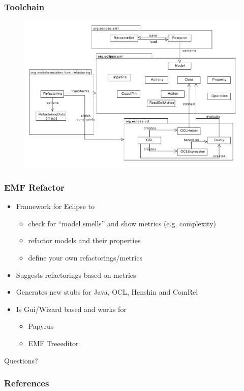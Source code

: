 \documentclass{beamer}
\begin{document}
\begin{frame}
\frametitle{Toolchain}
 \begin{figure}[h!t]
 \centering
 \includegraphics[scale=0.35]{figures/Toolchain2}
\end{figure}
\end{frame}

        
\begin{frame}
\frametitle{EMF Refactor}
\begin{itemize}
 \item Framework for Eclipse to
 \begin{itemize}
  \item check for ``model smells'' and show metrics (e.g. complexity)
  \item refactor models and their properties
  \item define your own refactorings/metrics
 \end{itemize}
 \item Suggests refactorings based on metrics
 \item Generates new stubs for Java, OCL, Henshin and ComRel
 \item Is Gui/Wizard based and works for
 \begin{itemize}
  \item Papyrus
  \item EMF Treeeditor
 \end{itemize}

\end{itemize}

\end{frame}
        

\begin{frame}
 \begin{center}
\Huge Questions?
\end{center}
\end{frame}

\begin{frame}
 \frametitle{References}
 
 
\end{frame}
\end{document}
